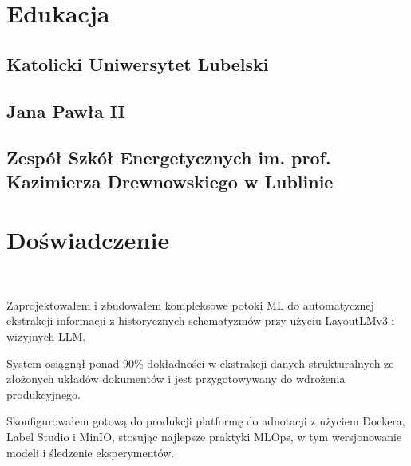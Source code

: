 \documentclass[]{deedy-resume-openfont}
\begin{document}
\begin{minipage}[t]{0.55\textwidth} 

\section{Edukacja} 
\subsection{Katolicki Uniwersytet Lubelski}
\subsection{Jana Pawła II}
\sectionsep 

\subsection{Zespół Szkół Energetycznych im. prof. Kazimierza Drewnowskiego w Lublinie}
\sectionsep




\section{Doświadczenie}

 \\
\vspace{\topsep} %
\begin{tightemize}
\item Zaprojektowałem i zbudowałem kompleksowe potoki ML do automatycznej ekstrakcji informacji z historycznych schematyzmów przy użyciu LayoutLMv3 i wizyjnych LLM.
\item System osiągnął ponad 90\% dokładności w ekstrakcji danych strukturalnych ze złożonych układów dokumentów i jest przygotowywany do wdrożenia produkcyjnego.
\item Skonfigurowałem gotową do produkcji platformę do adnotacji z użyciem Dockera, Label Studio i MinIO, stosując najlepsze praktyki MLOps, w tym wersjonowanie modeli i śledzenie eksperymentów.
\end{tightemize}
\sectionsep


\end{minipage}
\end{document}
